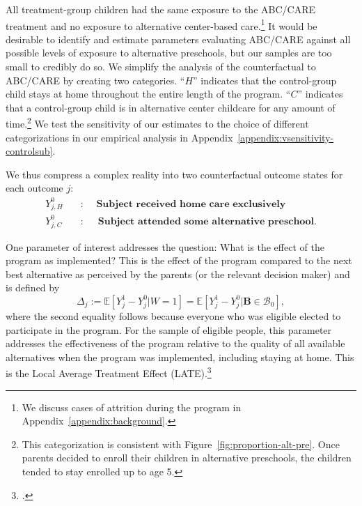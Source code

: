  All treatment-group children had the same exposure to the ABC/CARE treatment and no exposure to alternative center-based care.\footnote{We discuss cases of attrition during the program in Appendix~\ref{appendix:background}.} It would be desirable to identify and estimate parameters evaluating ABC/CARE against all possible levels of exposure to alternative preschools, but our samples are too small to credibly do so. We simplify the analysis of the counterfactual to ABC/CARE by creating two categories. ``$H$'' indicates that the control-group child stays at home throughout the entire length of the program. ``$C$'' indicates that a control-group child is in alternative center childcare for any amount of time.\footnote{This categorization is consistent with Figure~\ref{fig:proportion-alt-pre}. Once parents decided to enroll their children in alternative preschools, the children tended to stay enrolled up to age 5.} We test the sensitivity of our estimates to the choice of different categorizations in our empirical analysis in Appendix~\ref{appendix:vsensitivity-controlsub}.

We thus compress a complex reality into two counterfactual outcome states for each outcome $j$:
\begin{align*}
Y_{j,H}^0 \quad &: \quad \textbf{ Subject received home care exclusively} \\
Y_{j,C}^0 \quad &: \quad \textbf{ Subject attended some alternative preschool}.
\end{align*}


One parameter of interest addresses the question: What is the effect of the program as implemented? This is the effect of the program compared to the next best alternative as perceived by the parents (or the relevant decision maker) and is defined by
\begin{equation}\label{eq:effect}
\Delta_j := \mathbb{E} \left[ Y_{j}^1 -  Y_{j}^0 | W =1 \right] = \mathbb{E} \left[Y_{j}^1 -  Y_{j}^0 | \bm{B} \in \mathcal{B}_0 \right],
\end{equation}
where the second equality follows because everyone who was eligible elected to participate in the program. For the sample of eligible people, this parameter addresses the effectiveness of the program relative to the quality of all available alternatives when the program was implemented, including staying at home. This is the Local Average Treatment Effect (LATE).\footnote{\citet{Imbens_Angrist_1994_Econometrica}.}

